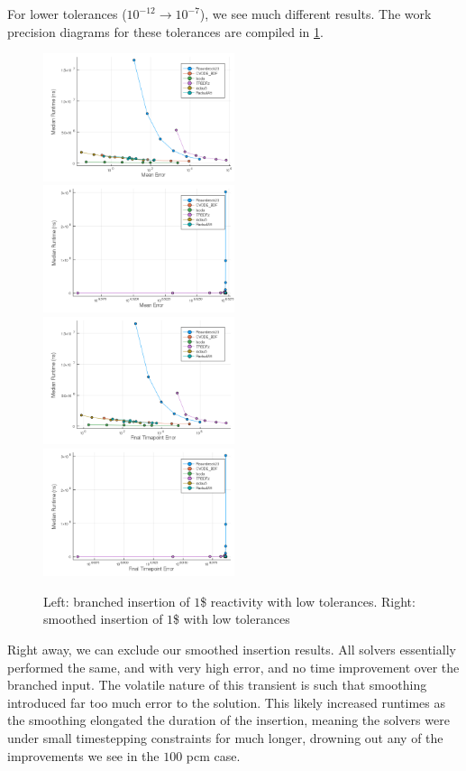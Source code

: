 \documentclass[review,onefignum,onetabnum]{siamart171218}
\begin{document}
For lower tolerances ($10^{-12} \rightarrow 10^{-7}$), we see much different results.
The work precision diagrams for these tolerances are compiled in \cref{fig:low-tol-both-dollar}.
\begin{figure}
  \includegraphics[width=0.5\textwidth]{../plots/work-precision/-low_tolerance_421pcm.png}
  \includegraphics[width=0.5\textwidth]{../plots/work-precision/-low_tolerance_421pcm_tanh.png}
  \includegraphics[width=0.5\textwidth]{../plots/work-precision/final_tp-low_tolerance_421pcm.png}
  \includegraphics[width=0.5\textwidth]{../plots/work-precision/final_tp-low_tolerance_421pcm_tanh.png}
  \caption{Left: branched insertion of $1$\$ reactivity with low tolerances.
  Right: smoothed insertion of $1$\$ with low tolerances}
  \label{fig:low-tol-both-dollar}
\end{figure}
Right away, we can exclude our smoothed insertion results. All solvers essentially performed
the same, and with very high error, and no time improvement over the branched input.
The volatile nature of this transient is such that smoothing introduced far too much
error to the solution. This likely increased runtimes as the smoothing elongated the duration
of the insertion, meaning the solvers were under small timestepping constraints for
much longer, drowning out any of the improvements we see in the $100$ pcm case. \\
\end{document}
